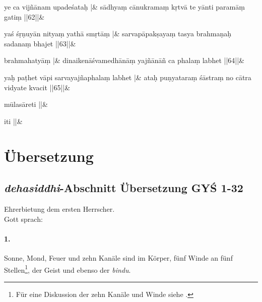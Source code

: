 \documentclass[a4paper,12pt]{article}
\begin{document}
\stanza
{} ye ca vijñānam upadeśataḥ |&
sādhyaṃ cānukramaṃ kṛtvā te yānti paramāṃ gatiṃ ||62||\&

\stanza
{}yaś  śṛṇuyān nityaṃ   yathā smṛtāṃ |&
sarvapāpakṣayaṃ tasya brahmaṇaḥ sadanaṃ bhajet ||63||\&

\stanza
{} brahmahatyāṃ  |&
dinaikenāśvamedhānāṃ yajñānāñ ca phalaṃ labhet ||64||\&

\stanza
{}yaḥ paṭhet  vāpi sarvayajñaphalaṃ labhet |&
ataḥ puṇyataraṃ śāstraṃ no cātra vidyate kvacit ||65||\&

\stanza
{}mūlasāreti ||\&

\stanza
{}iti  ||\&


\endnumbering


\clearpage
\section{Übersetzung}
\subsection{\textit{dehasiddhi}-Abschnitt Übersetzung GYŚ 1-32}

\noindent Ehrerbietung dem ersten Herrscher. \\

\noindent Gott sprach:

\paragraph{1.} Sonne, Mond, Feuer und zehn Kanäle sind im Körper, fünf Winde an fünf Stellen\footnote{Für eine Diskussion der zehn Kanäle und Winde siehe \parencite[188-198]{rootsofyoga2017}.}, der Geist und ebenso der \textit{bindu}.  
\end{document}
